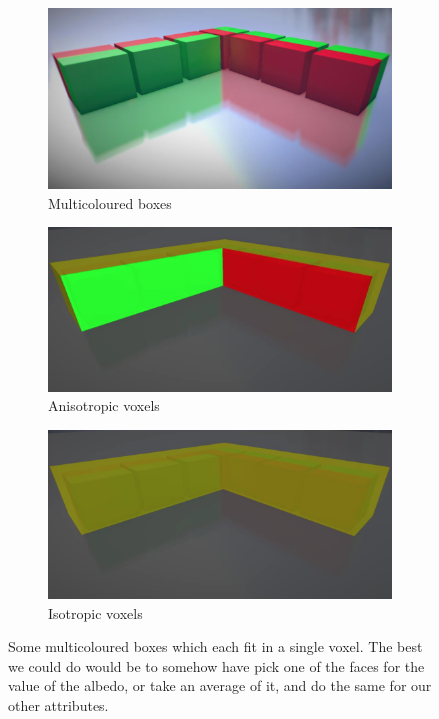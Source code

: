 \begin{figure}\label{f:vct-anisotropic-voxels-1}
	\begin{subfigure}[b]{0.314\textwidth}
		\includegraphics[width=1.0\textwidth]{graphics/vct/vct-11-2}
		\caption{Multicoloured boxes}
	\end{subfigure}
	\begin{subfigure}[b]{0.343\textwidth}
		\includegraphics[width=1.0\textwidth]{graphics/vct/vct-11-3}
		\caption{Anisotropic voxels}
	\end{subfigure}
	\begin{subfigure}[b]{0.336\textwidth}
		\includegraphics[width=1.0\textwidth]{graphics/vct/vct-11-4}
		\caption{Isotropic voxels}
	\end{subfigure}
	\caption{Some multicoloured boxes which each fit in a single voxel. The best we could do would be to somehow have pick one of the faces for the value of the albedo, or take an average of it, and do the same for our other attributes.}
\end{figure}

